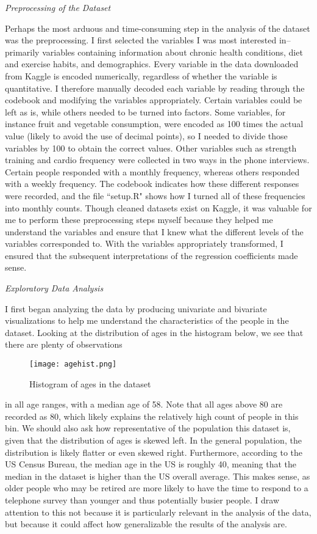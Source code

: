\documentclass[12pt]{article}
\begin{document}
\newpage \noindent \textit{Preprocessing of the Dataset}

\medskip
Perhaps the most arduous and time-consuming step in the analysis of the dataset was the preprocessing. I first selected the variables I was most interested in--primarily variables containing information about chronic health conditions, diet and exercise habits, and demographics. Every variable in the data downloaded from Kaggle is encoded numerically, regardless of whether the variable is quantitative. I therefore manually decoded each variable by reading through the codebook and modifying the variables appropriately. Certain variables could be left as is, while others needed to be turned into factors. Some variables, for instance fruit and vegetable consumption, were encoded as 100 times the actual value (likely to avoid the use of decimal points), so I needed to divide those variables by 100 to obtain the correct values. Other variables such as strength training and cardio frequency were collected in two ways in the phone interviews. Certain people responded with a monthly frequency, whereas others responded with a weekly frequency. The codebook indicates how these different responses were recorded, and the file ``setup.R" shows how I turned all of these frequencies into monthly counts. Though cleaned datasets exist on Kaggle, it was valuable for me to perform these preprocessing steps myself because they helped me understand the variables and ensure that I knew what the different levels of the variables corresponded to. With the variables appropriately transformed, I ensured that the subsequent interpretations of the regression coefficients made sense.

\bigskip
\noindent \textit{Exploratory Data Analysis}
\medskip

I first began analyzing the data by producing univariate and bivariate visualizations to help me understand the characteristics of the people in the dataset. Looking at the distribution of ages in the histogram below, we see that there are plenty of observations 
\begin{wrapfigure}[20]{r}{0.5\textwidth}
\centering
\texttt{[image: agehist.png]} 
\caption{Histogram of ages in the dataset}
\label{agehist}
\end{wrapfigure}%
in all age ranges, with a median age of 58. Note that all ages above 80 are recorded as 80, which likely explains the relatively high count of people in this bin. We should also ask how representative of the population this dataset is, given that the distribution of ages is skewed left. In the general population, the distribution is likely flatter or even skewed right. Furthermore, according to the US Census Bureau, the median age in the US is roughly 40, meaning that the median in the dataset is higher than the US overall average. This makes sense, as older people who may be retired are more likely to have the time to respond to a telephone survey than younger and thus potentially busier people. I draw attention to this not because it is particularly relevant in the analysis of the data, but because it could affect how generalizable the results of the analysis are. 
\end{document}
